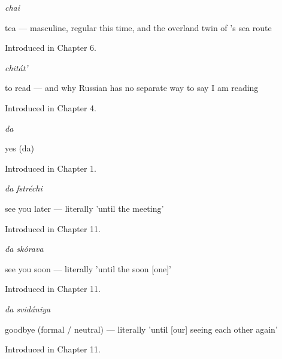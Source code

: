 \noindent\begin{minipage}[t]{\linewidth}
\raggedright
\textbf{}\enspace\emph{chai}\par
\small tea — masculine, regular this time, and the overland twin of 's sea route\par
\footnotesize Introduced in Chapter 6.
\end{minipage}\par\medskip

\noindent\begin{minipage}[t]{\linewidth}
\raggedright
\textbf{}\enspace\emph{chitát'}\par
\small to read — and why Russian has no separate way to say I am reading\par
\footnotesize Introduced in Chapter 4.
\end{minipage}\par\medskip

\noindent\begin{minipage}[t]{\linewidth}
\raggedright
\textbf{}\enspace\emph{da}\par
\small yes (da)\par
\footnotesize Introduced in Chapter 1.
\end{minipage}\par\medskip

\noindent\begin{minipage}[t]{\linewidth}
\raggedright
\textbf{ }\enspace\emph{da fstréchi}\par
\small see you later — literally 'until the meeting'\par
\footnotesize Introduced in Chapter 11.
\end{minipage}\par\medskip

\noindent\begin{minipage}[t]{\linewidth}
\raggedright
\textbf{ }\enspace\emph{da skórava}\par
\small see you soon — literally 'until the soon {[}one{]}'\par
\footnotesize Introduced in Chapter 11.
\end{minipage}\par\medskip

\noindent\begin{minipage}[t]{\linewidth}
\raggedright
\textbf{ }\enspace\emph{da svidániya}\par
\small goodbye (formal / neutral) — literally 'until {[}our{]} seeing each other again'\par
\footnotesize Introduced in Chapter 11.
\end{minipage}\par\medskip

